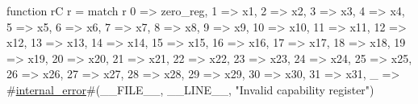function rC r = {
  match r {
    0  => zero_reg,
    1  => x1,
    2  => x2,
    3  => x3,
    4  => x4,
    5  => x5,
    6  => x6,
    7  => x7,
    8  => x8,
    9  => x9,
    10 => x10,
    11 => x11,
    12 => x12,
    13 => x13,
    14 => x14,
    15 => x15,
    16 => x16,
    17 => x17,
    18 => x18,
    19 => x19,
    20 => x20,
    21 => x21,
    22 => x22,
    23 => x23,
    24 => x24,
    25 => x25,
    26 => x26,
    27 => x27,
    28 => x28,
    29 => x29,
    30 => x30,
    31 => x31,
    _  => #\hyperref[sailRISCVzinternalzyerror]{internal\_error}#(__FILE__, __LINE__, "Invalid capability register")
  }
}
